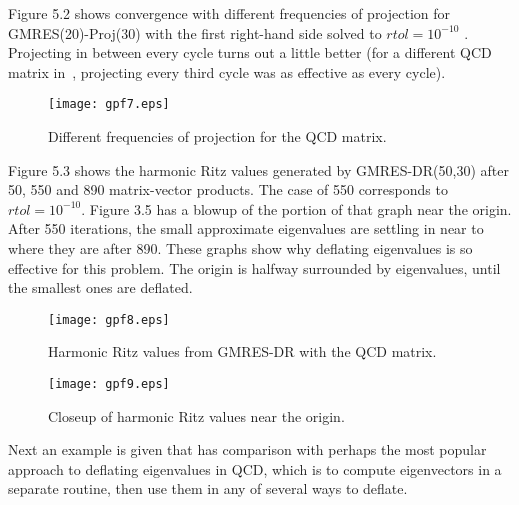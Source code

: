 \documentclass[final]{siamltex}
\begin{document}
Figure 5.2 shows convergence with different frequencies of projection for GMRES(20)-Proj(30) with the first right-hand side solved to $rtol = 10^{-10}$ .  Projecting in between every cycle turns out a little better (for a different QCD matrix in~\cite{Qcdconf}, projecting every third cycle was as effective as every cycle). 

\begin{figure}
\vspace{.10in}
\begin{center}
\texttt{[image: gpf7.eps]}
\end{center}
\vspace{.10in}
\caption{Different frequencies of projection for the QCD matrix.}
\end{figure}

Figure 5.3 shows the harmonic Ritz values generated by GMRES-DR(50,30) after 50, 550 and 890 matrix-vector products.  The case of 550 corresponds to $rtol = 10^{-10}$.  Figure 3.5 has a blowup of the portion of that graph near the origin.  After 550 iterations, the small approximate eigenvalues are settling in near to where they are after 890.  These graphs show why deflating eigenvalues is so effective for this problem.  The origin is halfway surrounded by eigenvalues, until the smallest ones are deflated.

\begin{figure}
\vspace{.10in}
\begin{center}
\texttt{[image: gpf8.eps]}
\end{center}
\vspace{.10in}
\caption{Harmonic Ritz values from GMRES-DR with the QCD matrix.}
\end{figure}

\begin{figure}
\vspace{.10in}
\begin{center}
\texttt{[image: gpf9.eps]}
\end{center}
\vspace{.10in}
\caption{Closeup of harmonic Ritz values near the origin.}
\end{figure}

Next an example is given that has comparison with perhaps the most popular approach to deflating eigenvalues in QCD, which is to compute eigenvectors in a separate routine, then use them in any of several ways to deflate.
\end{document}
